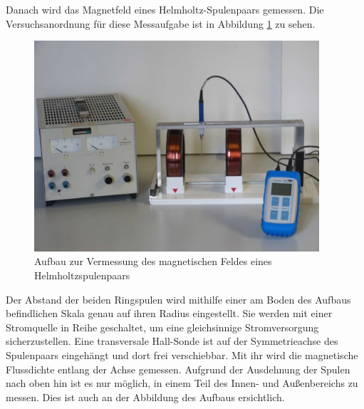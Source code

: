 Danach wird das Magnetfeld eines Helmholtz-Spulenpaars gemessen. Die Versuchsanordnung
für diese Messaufgabe ist in Abbildung \ref{fig:Aufbau_helmholtz} zu sehen.
\begin{figure}
  \centering
  \includegraphics[width=300pt]{data/aufbau2.png}
  \caption{Aufbau zur Vermessung des magnetischen Feldes eines
  Helmholtzspulenpaars \cite{Versuchsanleitung}}
  \label{fig:Aufbau_helmholtz}
\end{figure}
Der Abstand der beiden Ringspulen wird mithilfe einer am Boden des Aufbaus
befindlichen Skala genau auf ihren Radius eingestellt. Sie werden mit einer Stromquelle
in Reihe geschaltet, um eine gleichsinnige Stromversorgung sicherzustellen.
Eine transversale Hall-Sonde ist auf der Symmetrieachse des Spulenpaars eingehängt und
dort frei verschiebbar. Mit ihr wird die magnetische Flussdichte entlang der Achse
gemessen. Aufgrund der Ausdehnung der Spulen nach oben hin ist es nur möglich,
in einem Teil des Innen- und Außenbereichs zu messen. Dies ist auch an der Abbildung
des Aufbaus ersichtlich.

